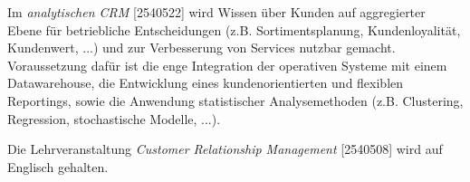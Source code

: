 \begin{module}
\begin{content}
 

Im \emph{analytischen CRM} [2540522] wird Wissen über Kunden auf aggregierter Ebene für betriebliche Entscheidungen (z.B. Sortimentsplanung, Kundenloyalität, Kundenwert, ...) und zur Verbesserung von Services nutzbar gemacht. Voraussetzung dafür ist die enge Integration der operativen Systeme mit einem Datawarehouse, die Entwicklung eines kundenorientierten und flexiblen Reportings, sowie die Anwendung statistischer Analysemethoden (z.B. Clustering, Regression, stochastische Modelle, ...).

 
\end{content}

\begin{remarks}Die Lehrveranstaltung \emph{Customer Relationship Management} [2540508] wird auf Englisch gehalten.

\end{remarks}

\end{module}

